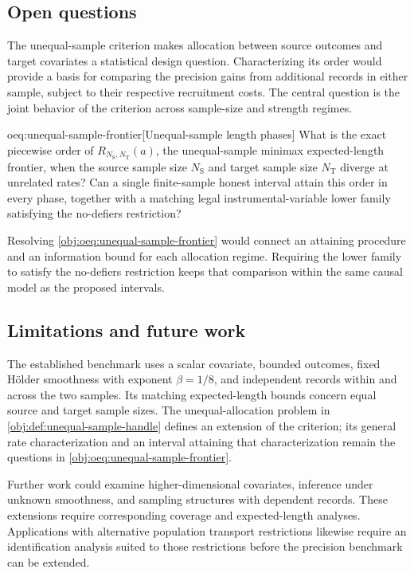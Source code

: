 \subsection{Open questions}

The unequal-sample criterion makes allocation between source outcomes and target covariates a statistical design question. Characterizing its order would provide a basis for comparing the precision gains from additional records in either sample, subject to their respective recruitment costs. The central question is the joint behavior of the criterion across sample-size and strength regimes.

\begin{remarkv}{oeq:unequal-sample-frontier}[Unequal-sample length phases]
What is the exact piecewise order of \(R_{N_{\mathrm S},N_{\mathrm T}}(a)\), the unequal-sample minimax expected-length frontier, when the source sample size \(N_{\mathrm S}\) and target sample size \(N_{\mathrm T}\) diverge at unrelated rates? Can a single finite-sample honest interval attain this order in every phase, together with a matching legal instrumental-variable lower family satisfying the no-defiers restriction?
\end{remarkv}

Resolving \cref{obj:oeq:unequal-sample-frontier} would connect an attaining procedure and an information bound for each allocation regime. Requiring the lower family to satisfy the no-defiers restriction keeps that comparison within the same causal model as the proposed intervals.

\subsection{Limitations and future work}

The established benchmark uses a scalar covariate, bounded outcomes, fixed Hölder smoothness with exponent \(\beta=1/8\), and independent records within and across the two samples. Its matching expected-length bounds concern equal source and target sample sizes. The unequal-allocation problem in \cref{obj:def:unequal-sample-handle} defines an extension of the criterion; its general rate characterization and an interval attaining that characterization remain the questions in \cref{obj:oeq:unequal-sample-frontier}.

Further work could examine higher-dimensional covariates, inference under unknown smoothness, and sampling structures with dependent records. These extensions require corresponding coverage and expected-length analyses. Applications with alternative population transport restrictions likewise require an identification analysis suited to those restrictions before the precision benchmark can be extended.
